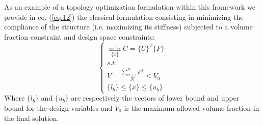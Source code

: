 As an example of a topology optimization formulation within this framework we provide in eq. (\ref{eq:12}) the classical formulation consisting in minimizing the compliance of the structure (i.e. maximizing its stiffness) subjected to a volume fraction constraint and design space constraints:
\begin{equation}
\label{eq:12}
    \begin{cases}
    \min_{\lbrace{x}\rbrace}{C=\lbrace{U}\rbrace^T\lbrace{F}\rbrace} \\
    s.t. \\
    V=\frac{\sum_{el=1}^{N}{\rho^{el}}}{N}\leq V_0\\
  \lbrace{l_b}\rbrace \leq \lbrace{x}\rbrace\leq\lbrace{u_b}\rbrace
    \end{cases}
\end{equation}
Where $\lbrace{l_b}\rbrace$ and $\lbrace{u_b}\rbrace$ are respectively the vectors of lower bound and upper bound for the design variables and $V_0$ is the maximum allowed volume fraction in the final solution.
